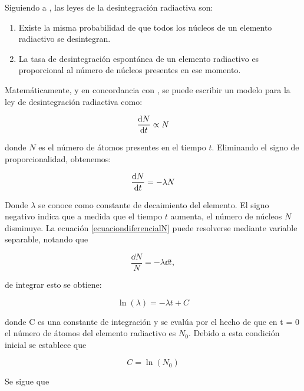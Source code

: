 \noindent Siguiendo a \cite{Krane.1987}, las leyes de la desintegración radiactiva son: 
\begin{enumerate}
    \item Existe la misma probabilidad de que todos los núcleos de un elemento radiactivo se desintegran. 
 	
    \item La tasa de desintegración espontánea de un elemento radiactivo es proporcional al número de núcleos presentes en ese momento.
 	
\end{enumerate}

\noindent Matemáticamente, y en concordancia con \cite{Podgorsak.2016}, se puede escribir un modelo para la ley de desintegración radiactiva como: 

\begin{equation*}
    \dv{N}{t} \propto N
\end{equation*}

\noindent donde $N$ es el número de átomos presentes en el tiempo $t$. Eliminando el signo de proporcionalidad, obtenemos: 

\begin{equation}
\dv{N}{t} = -\lambda N\label{ecuaciondiferencialN}
\end{equation} 

\noindent Donde $\lambda $ se conoce como constante de decaimiento del elemento. El signo negativo indica que a medida que el tiempo $t$ aumenta, el número de núcleos $N$ disminuye. La ecuación \ref{ecuaciondiferencialN} puede resolverse mediante variable separable, notando que

\begin{equation}
\frac{\dd{N}}{N} = -\lambda \dd{t},
\end{equation} 

\noindent de integrar esto se obtiene: 

\begin{equation}
\ln( \lambda ) = -\lambda t + C\label{ecuacionlambda}
\end{equation}

\noindent donde C es una constante de integración y se evalúa por el hecho de que en t = 0 el número de átomos del elemento radiactivo es $N_0$. Debido a esta condición inicial se establece que 

\begin{equation*}
    C = \ln(N_0)
\end{equation*}

Se sigue que 

